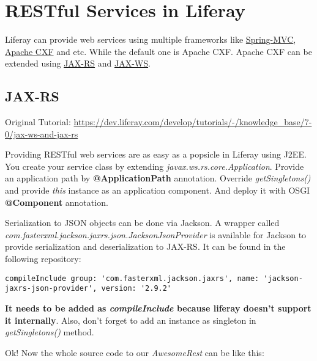 \section{RESTful Services in Liferay}

Liferay can provide web services using multiple frameworks like \href{https://docs.spring.io/spring/docs/current/spring-framework-reference/web.html}{Spring-MVC}, \href{https://en.wikipedia.org/wiki/Apache_CXF}{Apache CXF} and etc. While the default one is Apache CXF. Apache CXF can be extended using \href{https://en.wikipedia.org/wiki/Java_API_for_RESTful_Web_Services}{JAX-RS} and \href{https://en.wikipedia.org/wiki/Java_API_for_XML_Web_Services}{JAX-WS}.

\subsection{JAX-RS}
Original Tutorial: \url{https://dev.liferay.com/develop/tutorials/-/knowledge_base/7-0/jax-ws-and-jax-rs}

Providing RESTful web services are as easy as a popsicle in Liferay using J2EE. You create your service class by extending \textit{javax.ws.rs.core.Application}. Provide an application path by \textbf{@ApplicationPath} annotation. Override \textit{getSingletons()} and provide \textit{this} instance as an application component. And deploy it with OSGI \textbf{@Component} annotation.

Serialization to JSON objects can be done via Jackson. A wrapper called \textit{com.fasterxml.jackson.jaxrs.json.JacksonJsonProvider} is available for Jackson to provide serialization and deserialization to JAX-RS. It can be found in the following repository:

\lstset{language=groovy}
\begin{minipage}{\linewidth}
\begin{lstlisting}
compileInclude group: 'com.fasterxml.jackson.jaxrs', name: 'jackson-jaxrs-json-provider', version: '2.9.2'
\end{lstlisting}
\end{minipage}

\textbf{It needs to be added as \textit{compileInclude} because liferay doesn't support it internally}. Also, don't forget to add an instance as singleton in \textit{getSingletons()} method.

Ok! Now the whole source code to our \textit{AwesomeRest} can be like this:

